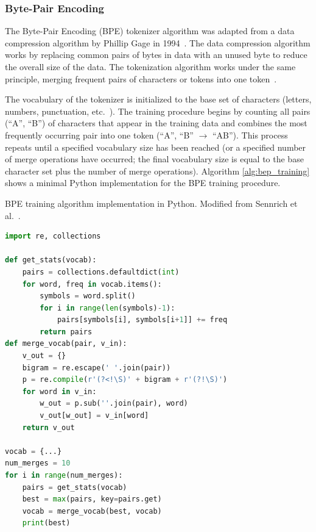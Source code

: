 \documentclass[12pt]{article}
\begin{document}
\subsubsection{Byte-Pair Encoding}\label{sec:bpe}
The Byte-Pair Encoding (BPE) tokenizer algorithm was adapted from a data compression algorithm by Phillip Gage in 1994~\cite{gage_feb94_1994}. The data compression algorithm works by replacing common pairs of bytes in data with an unused byte to reduce the overall size of the data. The tokenization algorithm works under the same principle, merging frequent pairs of characters or tokens into one token~\cite{sennrich_neural_2016}.

The vocabulary of the tokenizer is initialized to the base set of characters (letters, numbers, punctuation, etc.~). The training procedure begins by counting all pairs (``A'', ``B'') of characters that appear in the training data and combines the most frequently occurring pair into one token (``A'', ``B'' $\rightarrow$ ``AB''). This process repeats until a specified vocabulary size has been reached (or a specified number of merge operations have occurred; the final vocabulary size is equal to the base character set plus the number of merge operations). Algorithm \ref{alg:bep_training} shows a minimal Python implementation for the BPE training procedure.

\begin{algorithm}[!t]
    \caption{BPE training algorithm implementation in Python. Modified from Sennrich et al.~\cite{sennrich_neural_2016}.}
    \label{alg:bep_training}
    \begin{lstlisting}[language=Python]
import re, collections

def get_stats(vocab):
    pairs = collections.defaultdict(int)
    for word, freq in vocab.items():
        symbols = word.split()
        for i in range(len(symbols)-1):
            pairs[symbols[i], symbols[i+1]] += freq
        return pairs
def merge_vocab(pair, v_in):
    v_out = {}
    bigram = re.escape(' '.join(pair))
    p = re.compile(r'(?<!\S)' + bigram + r'(?!\S)')
    for word in v_in:
        w_out = p.sub(''.join(pair), word)
        v_out[w_out] = v_in[word]
    return v_out

vocab = {...}
num_merges = 10
for i in range(num_merges):
    pairs = get_stats(vocab)
    best = max(pairs, key=pairs.get)
    vocab = merge_vocab(best, vocab)
    print(best)
    \end{lstlisting}
\end{algorithm}
\end{document}
